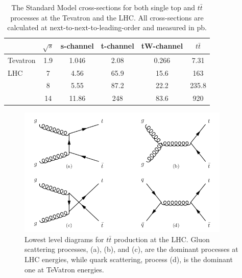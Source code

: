 \begin{table} \label{tab-ttbarcrosssections}
\begin{center}
\begin{tabular}{lccccc}
\hline
\hline
& \textbf{$\sqrt{s}$} & \textbf{s-channel} & \textbf{t-channel} & \textbf{tW-channel} & \textbf{$t\bar{t}$} \\
\hline
Tevatron & 1.9 & 1.046 & 2.08 & 0.266 & 7.31 \\
LHC & 7 & 4.56 & 65.9 & 15.6 & 163 \\ 
 & 8 & 5.55 & 87.2 & 22.2 & 235.8 \\
 & 14 & 11.86 & 248 & 83.6 & 920 \\
\hline
\hline
\end{tabular}
\caption{The Standard Model cross-sections for both single top and $t\bar{t}$ processes at the Tevatron and the LHC. All cross-sections are calculated at next-to-next-to-leading-order and measured in pb. \cite{Czakon:2013goa}}
\end{center}
\end{table}

\begin{figure} \label{fig-ttbarProductionLHC}
\begin{center}
\includegraphics[width=0.9\textwidth]{Figures/ttbarProductionLHC.png}
\caption{Lowest level diagrams for $t\bar{t}$ production at the LHC. Gluon scattering processes, {(a)}, {(b)}, and {(c)}, are the dominant processes at LHC energies, while quark scattering, process {(d)}, is the dominant one at TeVatron energies. \cite{SergeyThesis}}
\end{center}
\end{figure}

